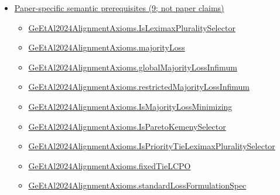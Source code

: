\documentclass[10pt]{article}
\begin{document}
\begin{itemize}[leftmargin=1.2em]
\begin{itemize}[leftmargin=1.2em]
\item \hyperlink{library-prerequisite-8c57c8838b32b597}{Applied\allowbreak{}Modeling\allowbreak{}Lib.\allowbreak{}Alignment.\allowbreak{}Axioms.\allowbreak{}kemeny\allowbreak{}Disagreement}
\end{itemize}
\item \hyperlink{paper-prerequisite-section-5ef5ef0364b6939c}{Paper-specific semantic prerequisites (9; not paper claims)}
\begin{itemize}[leftmargin=1.2em]
\item \hyperlink{paper-prerequisite-6a5d377445150f2f}{Ge\allowbreak{}Et\allowbreak{}Al2024\allowbreak{}Alignment\allowbreak{}Axioms.\allowbreak{}Is\allowbreak{}Leximax\allowbreak{}Plurality\allowbreak{}Selector}
\item \hyperlink{paper-prerequisite-8892d6fc4aee77f3}{Ge\allowbreak{}Et\allowbreak{}Al2024\allowbreak{}Alignment\allowbreak{}Axioms.\allowbreak{}majority\allowbreak{}Loss}
\item \hyperlink{paper-prerequisite-e532c12e5479137f}{Ge\allowbreak{}Et\allowbreak{}Al2024\allowbreak{}Alignment\allowbreak{}Axioms.\allowbreak{}global\allowbreak{}Majority\allowbreak{}Loss\allowbreak{}Infimum}
\item \hyperlink{paper-prerequisite-465cdc3ee9c9c6a0}{Ge\allowbreak{}Et\allowbreak{}Al2024\allowbreak{}Alignment\allowbreak{}Axioms.\allowbreak{}restricted\allowbreak{}Majority\allowbreak{}Loss\allowbreak{}Infimum}
\item \hyperlink{paper-prerequisite-c8ae4ba0fedf8db8}{Ge\allowbreak{}Et\allowbreak{}Al2024\allowbreak{}Alignment\allowbreak{}Axioms.\allowbreak{}Is\allowbreak{}Majority\allowbreak{}Loss\allowbreak{}Minimizing}
\item \hyperlink{paper-prerequisite-fa6ae496ed9c0c39}{Ge\allowbreak{}Et\allowbreak{}Al2024\allowbreak{}Alignment\allowbreak{}Axioms.\allowbreak{}Is\allowbreak{}Pareto\allowbreak{}Kemeny\allowbreak{}Selector}
\item \hyperlink{paper-prerequisite-f75cae04980bec13}{Ge\allowbreak{}Et\allowbreak{}Al2024\allowbreak{}Alignment\allowbreak{}Axioms.\allowbreak{}Is\allowbreak{}Priority\allowbreak{}Tie\allowbreak{}Leximax\allowbreak{}Plurality\allowbreak{}Selector}
\item \hyperlink{paper-prerequisite-fc38b98f65c4e72f}{Ge\allowbreak{}Et\allowbreak{}Al2024\allowbreak{}Alignment\allowbreak{}Axioms.\allowbreak{}fixed\allowbreak{}Tie\allowbreak{}LCPO}
\item \hyperlink{paper-prerequisite-efbd7cf1dcd57ea6}{Ge\allowbreak{}Et\allowbreak{}Al2024\allowbreak{}Alignment\allowbreak{}Axioms.\allowbreak{}standard\allowbreak{}Loss\allowbreak{}Formulation\allowbreak{}Spec}

\end{itemize}
\end{itemize}
\end{document}
